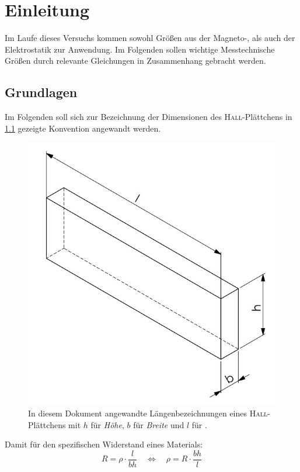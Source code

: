\chapter{Einleitung}
Im Laufe dieses Versuchs kommen sowohl Größen aus der Magneto-, als auch der Elektrostatik zur Anwendung. Im Folgenden
sollen wichtige Messtechnische Größen durch relevante Gleichungen in Zusammenhang gebracht werden.
\section{Grundlagen}
    Im Folgenden soll sich zur Bezeichnung der Dimensionen des \textsc{Hall}-Plättchens in \cref{fig:hall_dim} gezeigte
    Konvention angewandt werden.
    \begin{figure}[H]
        \centering
        \includegraphics[width=.6\textwidth]{CAD/hall_dim.jpg}%
        \caption[Konvention der Längenbezeichnungen]{In diesem Dokument angewandte Längenbezeichnungen eines \textsc{Hall}-Plättchens mit \(h\) für
        \textit{Höhe}, \(b\) für \textit{Breite} und \(l\) für .}%
        \label{fig:hall_dim}
    \end{figure}
    Damit für den spezifischen Widerstand eines Materials:
    \begin{equation}
        R = \rho \cdot \frac{l}{b h} \quad \Leftrightarrow \quad \rho = R \cdot \frac{b h}{l}%
        \label{eq:spezR}
    \end{equation}
